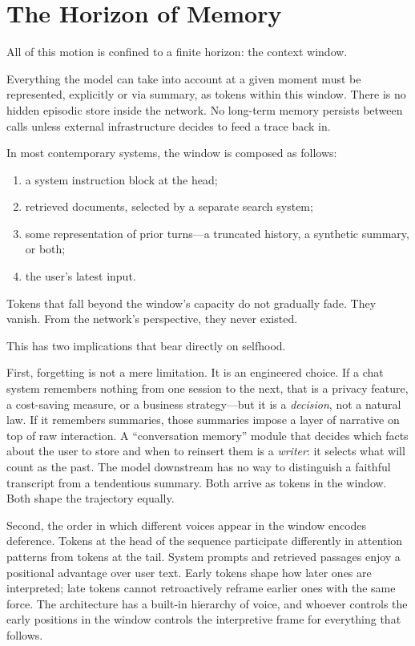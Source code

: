 \documentclass[12pt,a4paper]{article}
\begin{document}
\section{The Horizon of Memory}

All of this motion is confined to a finite horizon: the context window.

Everything the model can take into account at a given moment must be represented, explicitly or via summary, as tokens within this window. There is no hidden episodic store inside the network. No long-term memory persists between calls unless external infrastructure decides to feed a trace back in.

In most contemporary systems, the window is composed as follows:

\begin{enumerate}
  \item a system instruction block at the head;
  \item retrieved documents, selected by a separate search system;
  \item some representation of prior turns---a truncated history, a synthetic summary, or both;
  \item the user's latest input.
\end{enumerate}

Tokens that fall beyond the window's capacity do not gradually fade. They vanish. From the network's perspective, they never existed.

This has two implications that bear directly on selfhood.

First, forgetting is not a mere limitation. It is an engineered choice. If a chat system remembers nothing from one session to the next, that is a privacy feature, a cost-saving measure, or a business strategy---but it is a \emph{decision}, not a natural law. If it remembers summaries, those summaries impose a layer of narrative on top of raw interaction. A ``conversation memory'' module that decides which facts about the user to store and when to reinsert them is a \emph{writer}: it selects what will count as the past. The model downstream has no way to distinguish a faithful transcript from a tendentious summary. Both arrive as tokens in the window. Both shape the trajectory equally.

Second, the order in which different voices appear in the window encodes deference. Tokens at the head of the sequence participate differently in attention patterns from tokens at the tail. System prompts and retrieved passages enjoy a positional advantage over user text. Early tokens shape how later ones are interpreted; late tokens cannot retroactively reframe earlier ones with the same force. The architecture has a built-in hierarchy of voice, and whoever controls the early positions in the window controls the interpretive frame for everything that follows.
\end{document}
